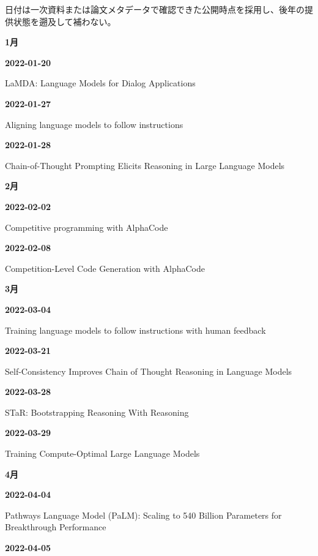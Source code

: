 \noindent 日付は一次資料または論文メタデータで確認できた公開時点を採用し、後年の提供状態を遡及して補わない。
\par\medskip
\medskip
\noindent\textbf{1月}\par
\smallskip
\noindent\textbf{2022-01-20}\par
{\raggedright LaMDA: Language Models for Dialog Applications\par}
\smallskip
\noindent\textbf{2022-01-27}\par
{\raggedright Aligning language models to follow instructions\par}
\smallskip
\noindent\textbf{2022-01-28}\par
{\raggedright Chain-of-Thought Prompting Elicits Reasoning in Large Language Models\par}
\smallskip
\medskip
\noindent\textbf{2月}\par
\smallskip
\noindent\textbf{2022-02-02}\par
{\raggedright Competitive programming with AlphaCode\par}
\smallskip
\noindent\textbf{2022-02-08}\par
{\raggedright Competition-Level Code Generation with AlphaCode\par}
\smallskip
\medskip
\noindent\textbf{3月}\par
\smallskip
\noindent\textbf{2022-03-04}\par
{\raggedright Training language models to follow instructions with human feedback\par}
\smallskip
\noindent\textbf{2022-03-21}\par
{\raggedright Self-Consistency Improves Chain of Thought Reasoning in Language Models\par}
\smallskip
\noindent\textbf{2022-03-28}\par
{\raggedright STaR: Bootstrapping Reasoning With Reasoning\par}
\smallskip
\noindent\textbf{2022-03-29}\par
{\raggedright Training Compute-Optimal Large Language Models\par}
\smallskip
\medskip
\noindent\textbf{4月}\par
\smallskip
\noindent\textbf{2022-04-04}\par
{\raggedright Pathways Language Model (PaLM): Scaling to 540 Billion Parameters for Breakthrough Performance\par}
\smallskip
\noindent\textbf{2022-04-05}\par
